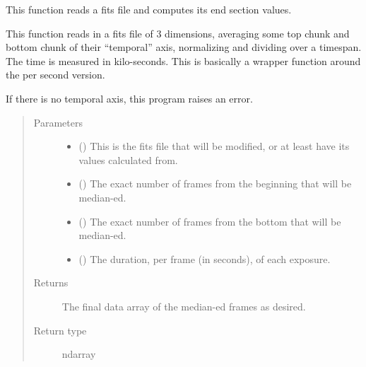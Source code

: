 \documentclass[letterpaper,10pt,english]{sphinxmanual}
\begin{document}
\begin{fulllineitems}
\label{\detokenize{python_docstrings/IfA_Smeargle.bravo.averaging:IfA_Smeargle.bravo.averaging.median_endpoints_per_kilosecond}}
This function reads a fits file and computes its end section values.

This function reads in a fits file of 3 dimensions, averaging some
top chunk and bottom chunk of their “temporal” axis, normalizing
and dividing over a timespan. The time is measured in kilo-seconds. This
is basically a wrapper function around the per second version.

If there is no temporal axis, this program raises an error.
\begin{quote}\begin{description}
\item[{Parameters}] \leavevmode\begin{itemize}
\item {} 
 () \textendash{} This is the fits file that will be modified, or at least have its
values calculated from.

\item {} 
 () \textendash{} The exact number of frames from the beginning that will be median-ed.

\item {} 
 () \textendash{} The exact number of frames from the bottom that will be median-ed.

\item {} 
 () \textendash{} The duration, per frame (in seconds), of each exposure.

\end{itemize}

\item[{Returns}] \leavevmode
{} \textendash{} The final data array of the median-ed frames as desired.

\item[{Return type}] \leavevmode
ndarray

\end{description}\end{quote}

\end{fulllineitems}
\end{document}
